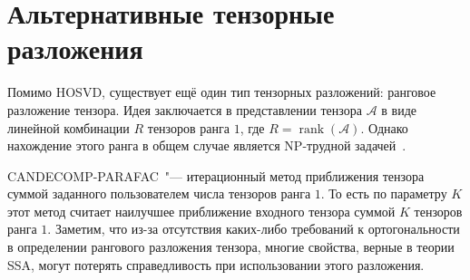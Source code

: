 \documentclass[specialist,
    substylefile = spbu_report.rtx,
    subf,href,colorlinks=true, 12pt]{disser}
\theoremstyle{plain}
\theoremstyle{definition}
\theoremstyle{remark}
\begin{document}
   
    \section{Альтернативные тензорные разложения}\label{sec:other-decomp}
    Помимо HOSVD, существует ещё один тип тензорных разложений: ранговое разложение тензора.
    Идея заключается в представлении тензора $\mathcal{A}$ в виде линейной комбинации $R$ тензоров ранга $1$, где $R=\operatorname{rank}(\mathcal{A})$.
    Однако нахождение этого ранга в общем случае является NP-трудной задачей~\cite{NP-hard}.

    CANDECOMP-PARAFAC~\cite{parafac1, parafac2}"--- итерационный метод приближения тензора суммой заданного
    пользователем числа тензоров ранга $1$.
    То есть по параметру $K$ этот метод считает наилучшее приближение входного тензора суммой $K$ тензоров ранга $1$.
    Заметим, что из-за отсутствия каких-либо требований к ортогональности в определении рангового разложения тензора,
    многие свойства, верные в теории SSA, могут потерять справедливость при использовании этого разложения.
\end{document}
